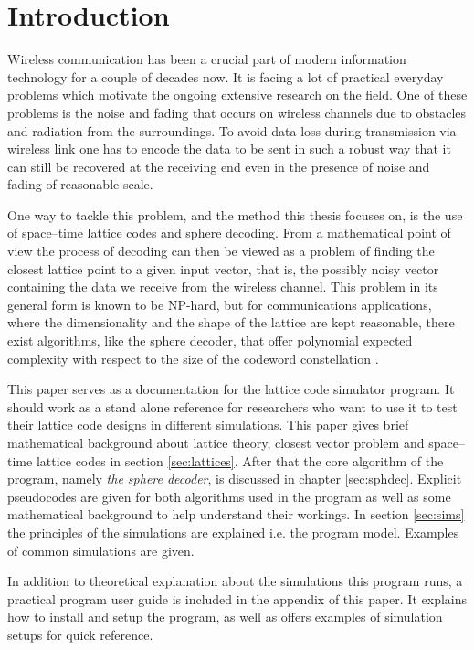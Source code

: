 \documentclass[english,12pt,a4paper,pdftex,sci,utf8]{aaltothesis}
\begin{document}
\section{Introduction}
Wireless communication has been a crucial part of modern information technology for a couple of decades now. It is facing a lot of practical everyday problems which motivate the ongoing extensive research on the field. One of these problems is the noise and fading that occurs on wireless channels due to obstacles and radiation from the surroundings. To avoid data loss during transmission via wireless link one has to encode the data to be sent in such a robust way that it can still be recovered at the receiving end even in the presence of noise and fading of reasonable scale. 
\par One way to tackle this problem, and the method this thesis focuses on, is the use of space--time lattice codes and sphere decoding. From a mathematical point of view the process of decoding can then be viewed as a problem of finding the closest lattice point to a given input vector, that is, the possibly noisy vector containing the data we receive from the wireless channel. This problem in its general form is known to be NP-hard, but for communications applications, where the dimensionality and the shape of the lattice are kept reasonable, there exist algorithms, like the sphere decoder, that offer polynomial expected complexity with respect to the size of the codeword constellation \cite{mia}.
\par This paper serves as a documentation for the lattice code simulator program. It should work as a stand alone reference for researchers who want to use it to test their lattice code designs in different simulations. This paper gives brief mathematical background about lattice theory, closest vector problem and space--time lattice codes in section \ref{sec:lattices}. After that the core algorithm of the program, namely \emph{the sphere decoder}, is discussed in chapter \ref{sec:sphdec}. Explicit pseudocodes are given for both algorithms used in the program as well as some mathematical background to help understand their workings. In section \ref{sec:sims} the principles of the simulations are explained i.e. the program model. Examples of common simulations are given.
\par In addition to theoretical explanation about the simulations this program runs, a practical program user guide is included in the appendix of this paper. It explains how to install and setup the program, as well as offers examples of simulation setups for quick reference.
\end{document}
